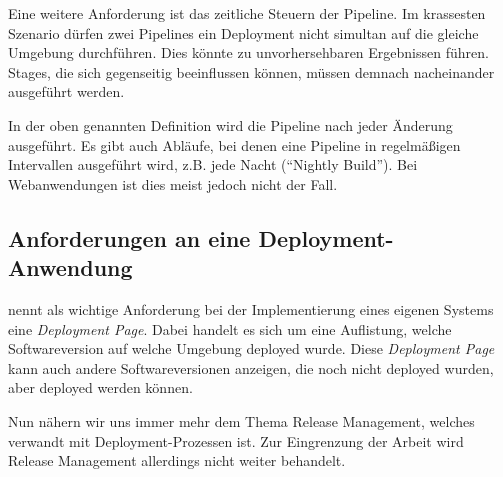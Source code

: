Eine weitere Anforderung ist das zeitliche Steuern der Pipeline. Im krassesten Szenario dürfen zwei Pipelines ein Deployment nicht simultan auf die gleiche Umgebung durchführen. Dies könnte zu unvorhersehbaren Ergebnissen führen. Stages, die sich gegenseitig beeinflussen können, müssen demnach nacheinander ausgeführt werden. \citep[119]{Humble2010}

In der oben genannten Definition wird die Pipeline nach jeder Änderung ausgeführt. Es gibt auch Abläufe, bei denen eine Pipeline in regelmäßigen Intervallen ausgeführt wird, z.B. jede Nacht (``Nightly Build''). Bei Webanwendungen ist dies meist jedoch nicht der Fall.

\subsection{Anforderungen an eine Deployment-Anwendung}

\citet[127]{Humble2010} nennt als wichtige Anforderung bei der Implementierung eines eigenen Systems eine \emph{Deployment Page}. Dabei handelt es sich um eine Auflistung, welche Softwareversion auf welche Umgebung deployed wurde. Diese \emph{Deployment Page} kann auch andere Softwareversionen anzeigen, die noch nicht deployed wurden, aber deployed werden können.

Nun nähern wir uns immer mehr dem Thema Release Management, welches verwandt mit Deployment-Prozessen ist. Zur Eingrenzung der Arbeit wird Release Management allerdings nicht weiter behandelt.
